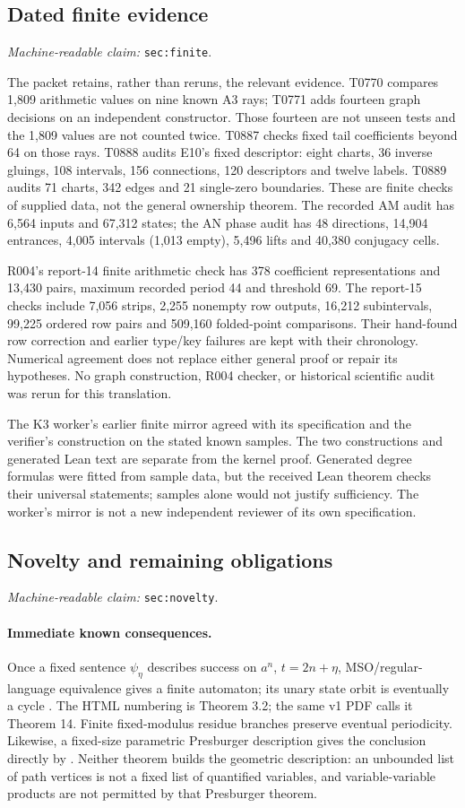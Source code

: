 \documentclass[11pt]{amsart}
\newcommand{\record}[1]{\nolinkurl{#1}}
\newcommand{\claimid}[1]{\par\nopagebreak\noindent\textit{Machine-readable claim:} \record{#1}.\par}
\theoremstyle{definition}\newtheorem{definition}{Definition}
\begin{document}
\subsection{Dated finite evidence}\label{sec:finite}
\claimid{sec:finite}
The packet retains, rather than reruns, the relevant evidence.
T0770 compares 1,809 arithmetic values on nine known A3 rays;
T0771 adds fourteen graph decisions on an independent constructor.
Those fourteen are not unseen tests and the 1,809 values are not counted
twice. T0887 checks fixed tail coefficients beyond 64 on those rays.
T0888 audits E10's fixed descriptor: eight charts, 36 inverse gluings,
108 intervals, 156 connections, 120 descriptors and twelve labels.
T0889 audits 71 charts, 342 edges and 21 single-zero boundaries.
These are finite checks of supplied data, not the general ownership
theorem. The recorded AM audit has 6,564 inputs and 67,312 states;
the AN phase audit has 48 directions, 14,904 entrances, 4,005 intervals
(1,013 empty), 5,496 lifts and 40,380 conjugacy cells.

R004's report-14 finite arithmetic check has 378 coefficient
representations and 13,430 pairs, maximum recorded period 44 and
threshold 69. The report-15 checks include 7,056 strips, 2,255 nonempty
row outputs, 16,212 subintervals, 99,225 ordered row pairs and 509,160
folded-point comparisons. Their hand-found row correction and earlier
type/key failures are kept with their chronology. Numerical agreement
does not replace either general proof or repair its hypotheses.
No graph construction, R004 checker, or historical scientific audit
was rerun for this translation.

The K3 worker's earlier finite mirror agreed with its specification
and the verifier's construction on the stated known samples. The two
constructions and generated Lean text are separate from the kernel
proof. Generated degree formulas were fitted from sample data, but the
received Lean theorem checks their universal statements; samples alone
would not justify sufficiency. The worker's mirror is not a new
independent reviewer of its own specification.

\subsection{Novelty and remaining obligations}\label{sec:novelty}
\claimid{sec:novelty}
\paragraph{Immediate known consequences.}
Once a fixed sentence $\psi_\eta$ describes success on $a^n$,
$t=2n+\eta$, MSO/regular-language equivalence gives a finite automaton;
its unary state orbit is eventually a cycle \cite[Section 3.1]{MSO}.
The HTML numbering is Theorem 3.2; the same v1 PDF calls it Theorem 14.
Finite fixed-modulus residue branches preserve eventual periodicity.
Likewise, a fixed-size parametric Presburger description gives the
conclusion directly by \cite[Theorem 1.15]{BGW}. Neither theorem builds
the geometric description: an unbounded list of path vertices is not
a fixed list of quantified variables, and variable-variable products
are not permitted by that Presburger theorem.
\end{document}
